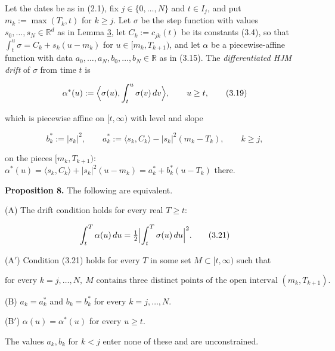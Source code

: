 \documentclass[11pt]{article}
\begin{document}
Let the dates be as in (2.1), fix \(j \in \{0, \dots, N\}\) and \(t \in I_j\), and put \(m_k := \max(T_k, t)\) for \(k \ge j\). Let \(\sigma\) be the step function with values \(s_0, \dots, s_N \in \mathbb R^d\) as in Lemma \hyperref[res:Lemma-3]{3}, let \(C_k := c_{jk}(t)\) be its constants (3.4), so that \(\int_t^u \sigma = C_k + s_k (u - m_k)\) for \(u \in [m_k, T_{k+1})\), and let \(\alpha\) be a piecewise-affine function with data \(a_0, \dots, a_N, b_0, \dots, b_N \in \mathbb R\) as in (3.15). The \emph{differentiated HJM drift} of \(\sigma\) from time \(t\) is

\begin{equation*}
\alpha^*(u) := \Bigl\langle \sigma(u), \int_t^u \sigma(v)\,dv \Bigr\rangle, \qquad u \ge t, \tag{3.19}\label{eq:3.19}
\end{equation*}

which is piecewise affine on \([t, \infty)\) with level and slope

\begin{equation*}
b^*_k := |s_k|^2, \qquad a^*_k := \langle s_k, C_k \rangle - |s_k|^2 (m_k - T_k), \qquad k \ge j, \tag{3.20}\label{eq:3.20}
\end{equation*}

on the pieces \([m_k, T_{k+1})\): \(\alpha^*(u) = \langle s_k, C_k \rangle + |s_k|^2 (u - m_k) = a^*_k + b^*_k (u - T_k)\) there.

\label{res:Proposition-8}
\textbf{Proposition 8.} The following are equivalent.

(A) The drift condition holds for every real \(T \ge t\):

\begin{equation*}
\int_t^T \alpha(u)\,du = \tfrac12 \Bigl| \int_t^T \sigma(u)\,du \Bigr|^2. \tag{3.21}\label{eq:3.21}
\end{equation*}

(A\('\)) Condition (3.21) holds for every \(T\) in some set \(M \subset [t, \infty)\) such that

\begin{equation*}
\text{for every } k = j, \dots, N,\ M \text{ contains three distinct points of the open interval } (m_k, T_{k+1}). \tag{3.22}\label{eq:3.22}
\end{equation*}

(B) \(a_k = a^*_k\) and \(b_k = b^*_k\) for every \(k = j, \dots, N\).

(B\('\)) \(\alpha(u) = \alpha^*(u)\) for every \(u \ge t\).

The values \(a_k, b_k\) for \(k < j\) enter none of these and are unconstrained.
\end{document}
